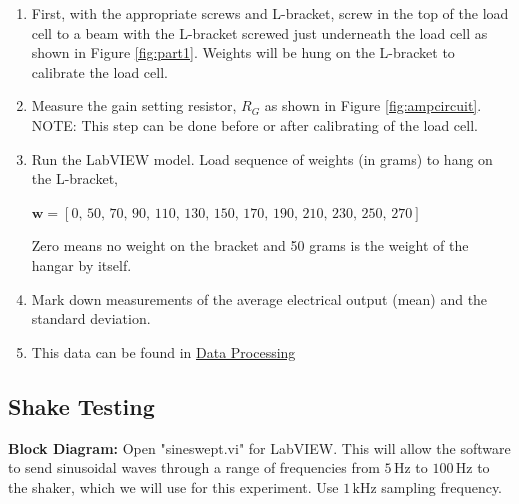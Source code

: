 \documentclass{article}
\begin{document}
\begin{enumerate}
    \item First, with the appropriate screws and L-bracket, screw in the top of the load cell to a beam with the L-bracket screwed just underneath the load cell as shown in Figure \ref{fig:part1}. Weights will be hung on the L-bracket to calibrate the load cell.
    \item Measure the gain setting resistor, $R_{G}$ as shown in Figure \ref{fig:ampcircuit}.\\
    NOTE: This step can be done before or after calibrating of the load cell.
    \item Run the LabVIEW model. Load sequence of weights (in grams) to hang on the L-bracket,
    \begin{center}
    $\textbf{w} = \left[0,\, 50,\, 70,\, 90,\, 110,\, 130,\, 150,\, 170,\, 190,\, 210,\, 230,\, 250,\, 270\right]$
    \end{center}
    Zero means no weight on the bracket and 50 grams is the weight of the hangar by itself. 
    \item Mark down measurements of the average electrical output (mean) and the standard deviation.
    \item This data can be found in \hyperlink{datapro}{Data Processing}
\end{enumerate}

\subsection{Shake Testing}
\textbf{Block Diagram:} Open "sineswept.vi" for LabVIEW. This will allow the software to send sinusoidal waves through a range of frequencies from $5\, \text{Hz}$ to $100\, \text{Hz}$ to the shaker, which we will use for this experiment. Use $1\, \text{kHz}$ sampling frequency.
\vspace{5mm}
\end{document}

